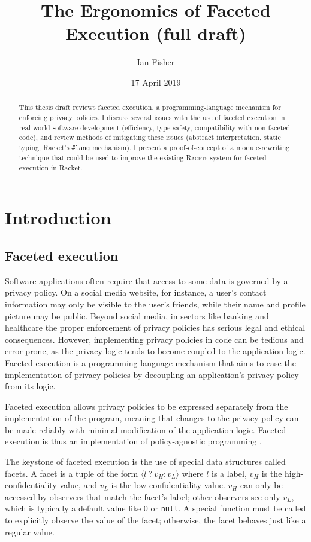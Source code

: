 \documentclass{article}
\title{The Ergonomics of Faceted Execution (full draft)}
\author{Ian Fisher}
\date{17 April 2019}
\begin{document}
\maketitle

\begin{abstract}
	This thesis draft reviews faceted execution, a programming-language mechanism for enforcing privacy policies. I discuss several issues with the use of faceted execution in real-world software development (efficiency, type safety, compatibility with non-faceted code), and review methods of mitigating these issues (abstract interpretation, static typing, Racket's \texttt{\#lang} mechanism). I present a proof-of-concept of a module-rewriting technique that could be used to improve the existing \textsc{Racets} system \cite{racets} for faceted execution in Racket.
\end{abstract}

\tableofcontents



\section{Introduction}
\subsection{Faceted execution\label{sec:facets}}
Software applications often require that access to some data is governed by a privacy policy. On a social media website, for instance, a user's contact information may only be visible to the user's friends, while their name and profile picture may be public. Beyond social media, in sectors like banking and healthcare the proper enforcement of privacy policies has serious legal and ethical consequences. However, implementing privacy policies in code can be tedious and error-prone, as the privacy logic tends to become coupled to the application logic. Faceted execution is a programming-language mechanism that aims to ease the implementation of privacy policies by decoupling an application's privacy policy from its logic.

Faceted execution allows privacy policies to be expressed separately from the implementation of the program, meaning that changes to the privacy policy can be made reliably with minimal modification of the application logic. Faceted execution is thus an implementation of policy-agnostic programming \cite{faceted}.

The keystone of faceted execution is the use of special data structures called facets. A facet is a tuple of the form $\langle l\ ?\ v_H : v_L \rangle$ where $l$ is a label, $v_H$ is the high-confidentiality value, and $v_L$ is the low-confidentiality value. $v_H$ can only be accessed by observers that match the facet's label; other observers see only $v_L$, which is typically a default value like $0$ or \texttt{null}. A special function must be called to explicitly observe the value of the facet; otherwise, the facet behaves just like a regular value.
\end{document}
